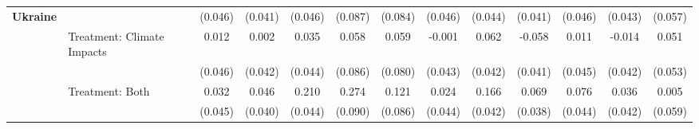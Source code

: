\begin{tabular}[t]{llccccccccccc}
\textbf{Ukraine} &  & (0.046) & (0.041) & (0.046) & (0.087) & (0.084) & (0.046) & (0.044) & (0.041) & (0.046) & (0.043) & (0.057)\\
 & Treatment: Climate Impacts & 0.012 & 0.002 & 0.035 & 0.058 & 0.059 & -0.001 & 0.062 & -0.058 & 0.011 & -0.014 & 0.051\\
 &  & (0.046) & (0.042) & (0.044) & (0.086) & (0.080) & (0.043) & (0.042) & (0.041) & (0.045) & (0.042) & (0.053)\\
 & Treatment: Both & 0.032 & 0.046 & 0.210 & 0.274 & 0.121 & 0.024 & 0.166 & 0.069 & 0.076 & 0.036 & 0.005\\
 &  & (0.045) & (0.040) & (0.044) & (0.090) & (0.086) & (0.044) & (0.042) & (0.038) & (0.044) & (0.042) & (0.059)\\
\bottomrule
\bottomrule
\end{tabular}